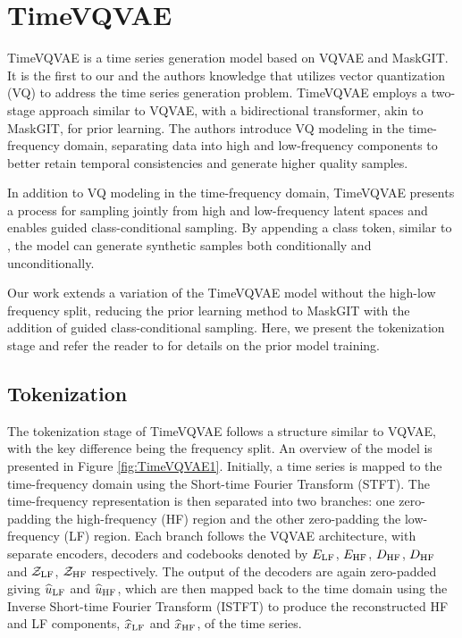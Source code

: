 \documentclass[../../thesis.tex]{subfiles}
\begin{document}
\section{TimeVQVAE}

TimeVQVAE is a time series generation model based on VQVAE and MaskGIT. It is the first to our and the authors knowledge that utilizes vector quantization (VQ) to address the time series generation problem. TimeVQVAE employs a two-stage approach similar to VQVAE, with a bidirectional transformer, akin to MaskGIT, for prior learning. The authors introduce VQ modeling in the time-frequency domain, separating data into high and low-frequency components to better retain temporal consistencies and generate higher quality samples.\newline

In addition to VQ modeling in the time-frequency domain, TimeVQVAE presents a process for sampling jointly from high and low-frequency latent spaces and enables guided class-conditional sampling. By appending a class token, similar to \cite{dosovitskiy2021image}, the model can generate synthetic samples both conditionally and unconditionally.\newline

Our work extends a variation of the TimeVQVAE model without the high-low frequency split, reducing the prior learning method to MaskGIT with the addition of guided class-conditional sampling. Here, we present the tokenization stage and refer the reader to \cite{VQVAE} for details on the prior model training.

\subsection{Tokenization}
The tokenization stage of TimeVQVAE follows a structure similar to VQVAE, with the key difference being the frequency split. An overview of the model is presented in Figure \ref{fig:TimeVQVAE1}. Initially, a time series is mapped to the time-frequency domain using the Short-time Fourier Transform (STFT). The time-frequency representation is then separated into two branches: one zero-padding the high-frequency (HF) region and the other zero-padding the low-frequency (LF) region. Each branch follows the VQVAE architecture, with separate encoders, decoders and codebooks denoted by $E_{\mathrm{LF}}$, $E_{\mathrm{HF}}$, $D_{\mathrm{HF}}$, $D_{\mathrm{HF}}$ and $\mathcal{Z}_{\mathrm{LF}}$, $\mathcal{Z}_{\mathrm{HF}}$ respectively. The output of the decoders are again zero-padded giving $\widehat{u}_{\mathrm{LF}}$ and $\widehat{u}_{\mathrm{HF}}$, which are then mapped back to the time domain using the Inverse Short-time Fourier Transform (ISTFT) to produce the reconstructed HF and LF components, $\widehat{x}_{\mathrm{LF}}$ and $\widehat{x}_{\mathrm{HF}}$, of the time series.
\end{document}
